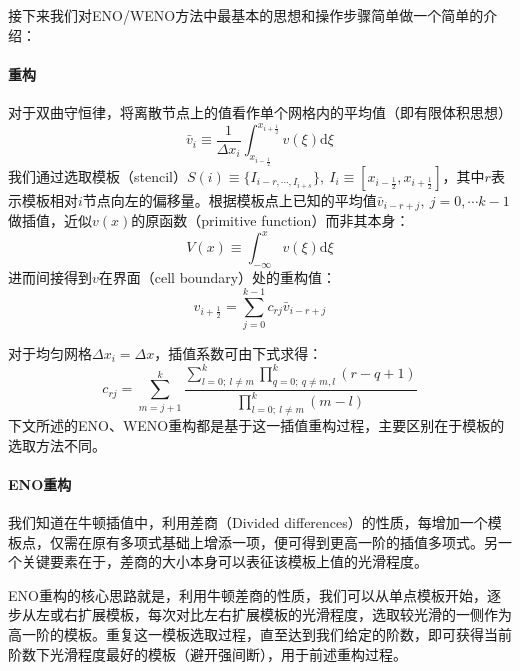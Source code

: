 \documentclass[11pt]{article}
\begin{document}
接下来我们对ENO/WENO方法中最基本的思想和操作步骤简单做一个简单的介绍：
\paragraph{重构} 对于双曲守恒律，将离散节点上的值看作单个网格内的平均值（即有限体积思想）
\begin{equation}
	\bar{v}_i\equiv\frac{1}{\Delta x_i}\int_{x_{i-\frac{1}{2}}}^{x_{i+\frac{1}{2}}}v(\xi)\mathrm{d}\xi
\end{equation}
我们通过选取模板（stencil）$S(i)\equiv\{I_{i-r,\cdots,I_{i+s}}\},\ I_i\equiv\left[x_{i-\frac{1}{2}},x_{i+\frac{1}{2}}\right]$，其中$r$表示模板相对$i$节点向左的偏移量。根据模板点上已知的平均值$\bar{v}_{i-r+j},\ j=0,\cdots k-1$做插值，近似$v(x)$的原函数（primitive function）而非其本身：
\begin{equation}
	V(x)\equiv\int_{-\infty}^x v(\xi)\mathrm{d}\xi
\end{equation}
进而间接得到$v$在界面（cell boundary）处的重构值：
\begin{equation}
	v_{i+\frac{1}{2}}=\sum_{j=0}^{k-1}c_{rj}\bar{v}_{i-r+j}
\end{equation}

对于均匀网格$\Delta x_i=\Delta x$，插值系数可由下式求得：
\begin{equation}
	c_{rj}=\sum_{m=j+1}^k\dfrac{\sum_{l=0;\ l\neq m}^k\prod_{q=0;\ q\neq m,l}^k\left(r-q+1\right)}{\prod_{l=0;\ l\neq m}^k\left(m-l\right)}
\end{equation}
下文所述的ENO、WENO重构都是基于这一插值重构过程，主要区别在于模板的选取方法不同。

\paragraph{ENO重构} 我们知道在牛顿插值中，利用差商（Divided differences）的性质，每增加一个模板点，仅需在原有多项式基础上增添一项，便可得到更高一阶的插值多项式\citep{sauer_numerical_2018}。另一个关键要素在于，差商的大小本身可以表征该模板上值的光滑程度\citep{cockburn_advanced_1998}。

ENO重构的核心思路就是，利用牛顿差商的性质，我们可以从单点模板开始，逐步从左或右扩展模板，每次对比左右扩展模板的光滑程度，选取较光滑的一侧作为高一阶的模板。重复这一模板选取过程，直至达到我们给定的阶数，即可获得当前阶数下光滑程度最好的模板（避开强间断），用于前述重构过程。
\end{document}
